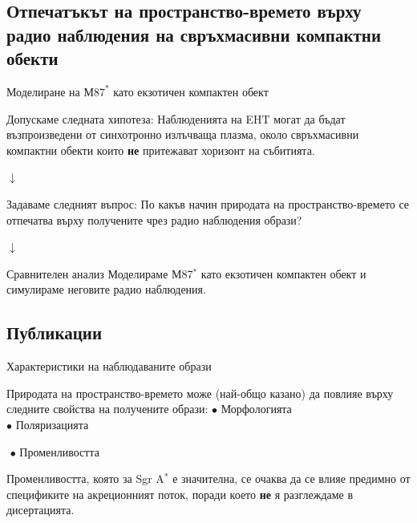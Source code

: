 \documentclass[hyperref={colorlinks,citecolor=blue,linkcolor=blue,urlcolor=blue}]{beamer}
\begin{document}
	\subsection{Отпечатъкът на пространство-времето върху радио наблюдения на свръхмасивни компактни обекти}
	
	\begin{frame}{Моделиране на М$87^*$ като екзотичен компактен обект}		
		
		\begin{block}{Допускаме следната хипотеза:}
			Наблюденията на EHT могат да
			бъдат възпроизведени от синхотронно излъчваща плазма, около свръхмасивни
			компактни обекти които \textbf{не} притежават хоризонт на събитията.
		\end{block}	
		
		\begin{center}
			$\downarrow$
		\end{center}
		\begin{alertblock}{Задаваме следният въпрос:}
			По какъв начин природата на пространство-времето се отпечатва върху получените чрез радио наблюдения образи?
		\end{alertblock}
		\begin{center}
			$\downarrow$
		\end{center}
		\begin{block}{Сравнителен анализ}
			Моделираме М87$^*$ като екзотичен компактен обект и симулираме неговите радио наблюдения.
		\end{block}
		
	\end{frame}
	
	\subsection{Публикации}
	
	\begin{frame}{Характеристики на наблюдаваните образи}
		\begin{block}{Природата на пространство-времето може (най-общо казано) да повлияе върху следните свойства на получените образи:}
			\centering
			$\bullet$ Морфологията\\
			$\bullet$ Поляризацията
			\begin{alertblock}{$ $}
				\centering
				$\bullet$ Променливостта
			\end{alertblock}
			
		\end{block}
		
		Променливостта, която за Sgr A$^*$ е значителна, се очаква да се влияе предимно от спецификите на акреционният поток, поради което \textbf{не} я разглеждаме в дисертацията.
		
	\end{frame}
	
\end{document}
